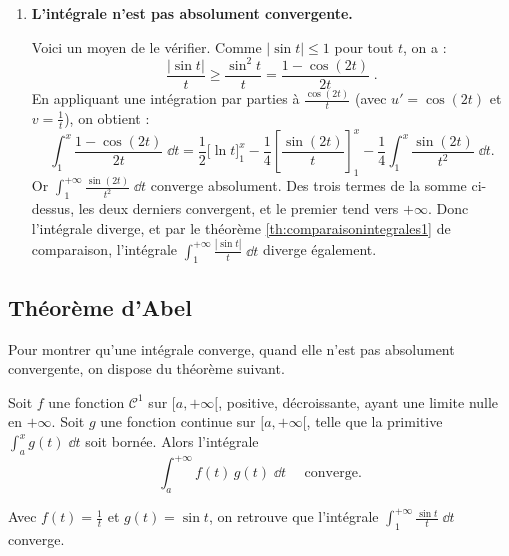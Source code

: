 \documentclass[class=report,crop=false]{standalone}
\begin{document}
\begin{exemple}
\begin{enumerate}
  
  \item \textbf{L'intégrale n'est pas absolument convergente.}
  
  Voici un moyen de le vérifier. Comme $\big| \sin t \big|\le 1$ pour tout
$t$, on a :
$$\frac{|\sin t|}{t} \ge \frac{\sin^2 t}{t} = \frac{1-\cos(2t)}{2t}\;.$$
En appliquant une intégration par parties à 
$\frac{\cos(2t)}{t}$ (avec $u'=\cos(2t)$ et $v=\frac1t$), on obtient :
$$\int_1^x \frac{1-\cos(2t)}{2t}\;\dd t
 = \frac{1}{2}\Big[\ln t\Big]_1^x - \frac{1}{4}
 \left[\frac{\sin(2t)}{t}\right]_1^x
-\frac{1}{4}\int_1^x \frac{\sin(2t)}{t^2}\;\dd t.
$$ 
Or $\int_1^{+\infty}\frac{\sin(2t)}{t^2}\;\dd t$ converge absolument. 
Des trois termes de la somme ci-dessus, les deux
derniers convergent, et le premier tend vers $+\infty$. Donc
l'intégrale diverge, et par le théorème \ref{th:comparaisonintegrales1} de comparaison, 
l'intégrale $\int_1^{+\infty}
\frac{|\sin t|}{t}\;\dd t$ diverge également.
  
\end{enumerate}  
\end{exemple}


\subsection{Théorème d'Abel}


Pour montrer qu'une intégrale converge, quand elle n'est pas
absolument convergente, on dispose du théorème suivant.

\begin{theoreme}
\label{th:abelintcv1}
Soit $f$ une fonction $\mathcal{C}^1$ sur $[a,+\infty[$, positive,
décroissante, ayant une limite nulle en $+\infty$.
Soit $g$ une fonction continue sur $[a,+\infty[$, telle que la
primitive $\int_a^x g(t)\;\dd t$ soit bornée.
Alors l'intégrale
$$
\int_a^{+\infty} f(t)\,g(t)\;\dd t\quad\text{ converge.}
$$
\end{theoreme}

Avec $f(t)=\frac1t$ et $g(t)=\sin t$, on retrouve que 
l'intégrale $\displaystyle \int_1^{+\infty} \frac{\sin t }{t}\;\dd t$ converge.
\end{document}
